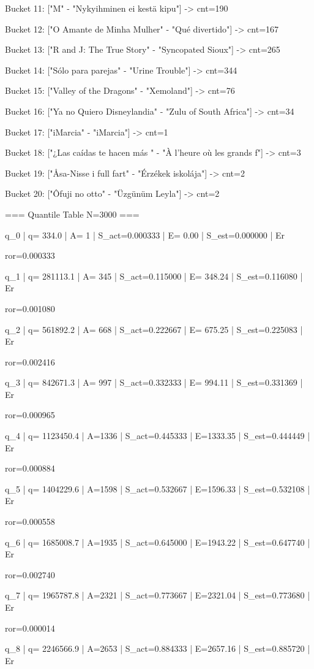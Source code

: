 \documentclass[11pt,a4paper]{article}
\begin{document}
Bucket 11: ["M" - "Nykyihminen ei kestä kipu"] -> cnt=190

Bucket 12: ["O Amante de Minha Mulher" - "Qué divertido"] -> cnt=167

Bucket 13: ["R and J: The True Story" - "Syncopated Sioux"] -> cnt=265

Bucket 14: ["Sólo para parejas" - "Urine Trouble"] -> cnt=344

Bucket 15: ["Valley of the Dragons" - "Xemoland"] -> cnt=76

Bucket 16: ["Ya no Quiero Disneylandia" - "Zulu of South Africa"] -> cnt=34

Bucket 17: ["iMarcia" - "iMarcia"] -> cnt=1

Bucket 18: ["¿Las caídas te hacen más " - "À l'heure où les grands f"] -> cnt=3

Bucket 19: ["Åsa-Nisse i full fart" - "Érzékek iskolája"] -> cnt=2

Bucket 20: ["Ôfuji no otto" - "Üzgünüm Leyla"] -> cnt=2


=== Quantile Table N=3000 ===

q\_0 | q=       334.0 | A=   1 | S\_act=0.000333 | E=   0.00 | S\_est=0.000000 | Er

ror=0.000333

q\_1 | q=    281113.1 | A= 345 | S\_act=0.115000 | E= 348.24 | S\_est=0.116080 | Er

ror=0.001080

q\_2 | q=    561892.2 | A= 668 | S\_act=0.222667 | E= 675.25 | S\_est=0.225083 | Er

ror=0.002416

q\_3 | q=    842671.3 | A= 997 | S\_act=0.332333 | E= 994.11 | S\_est=0.331369 | Er

ror=0.000965

q\_4 | q=   1123450.4 | A=1336 | S\_act=0.445333 | E=1333.35 | S\_est=0.444449 | Er

ror=0.000884

q\_5 | q=   1404229.6 | A=1598 | S\_act=0.532667 | E=1596.33 | S\_est=0.532108 | Er

ror=0.000558

q\_6 | q=   1685008.7 | A=1935 | S\_act=0.645000 | E=1943.22 | S\_est=0.647740 | Er

ror=0.002740

q\_7 | q=   1965787.8 | A=2321 | S\_act=0.773667 | E=2321.04 | S\_est=0.773680 | Er

ror=0.000014

q\_8 | q=   2246566.9 | A=2653 | S\_act=0.884333 | E=2657.16 | S\_est=0.885720 | Er
\end{document}
